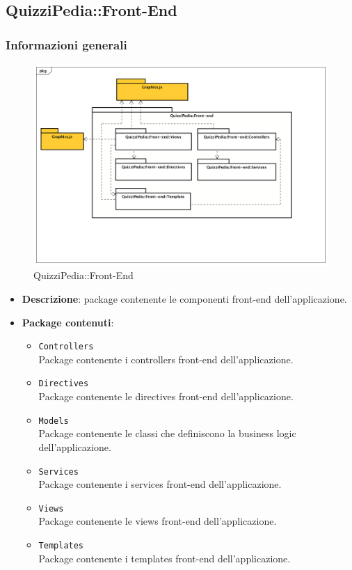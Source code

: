 \subsection{QuizziPedia::Front-End}
\subsubsection{Informazioni generali}
\label{QuizziPedia::Front-End}
\begin{figure}
	\centering
	\includegraphics[scale=0.45]{UML/Package/QuizziPedia_Front-end.png}
	\caption{QuizziPedia::Front-End}
\end{figure}

	\begin{itemize}
		\item \textbf{Descrizione}: package contenente le componenti front-end dell'applicazione.
		\item \textbf{Package contenuti}:
		\begin{itemize}
			\item \texttt{Controllers} \\ Package contenente i controllers front-end dell'applicazione.
			\item \texttt{Directives} \\ Package contenente le directives front-end dell'applicazione.
			\item \texttt{Models} \\ Package contenente le classi che definiscono la business logic dell'applicazione.
			\item \texttt{Services} \\ Package contenente i services front-end dell'applicazione.
			\item \texttt{Views} \\ Package contenente le views front-end dell'applicazione.
			\item \texttt{Templates} \\ Package contenente i templates front-end dell'applicazione.
		\end{itemize}
	\end{itemize}
	